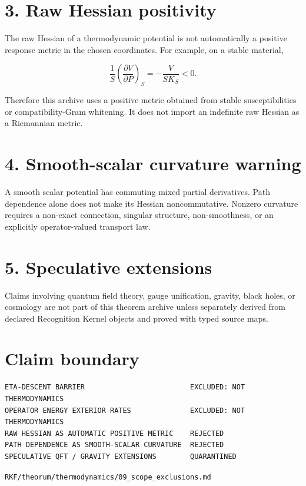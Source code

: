 \hypertarget{raw-hessian-positivity}{%
\section{3. Raw Hessian positivity}\label{raw-hessian-positivity}}

The raw Hessian of a thermodynamic potential is not automatically a positive response metric in the chosen coordinates. For example, on a stable material,

\[
\frac1S\left(\frac{\partial V}{\partial P}\right)_S
=-\frac{V}{SK_S}<0.
\]

Therefore this archive uses a positive metric obtained from stable susceptibilities or compatibility-Gram whitening. It does not import an indefinite raw Hessian as a Riemannian metric.

\hypertarget{smooth-scalar-curvature-warning}{%
\section{4. Smooth-scalar curvature warning}\label{smooth-scalar-curvature-warning}}

A smooth scalar potential has commuting mixed partial derivatives. Path dependence alone does not make its Hessian noncommutative. Nonzero curvature requires a non-exact connection, singular structure, non-smoothness, or an explicitly operator-valued transport law.

\hypertarget{speculative-extensions}{%
\section{5. Speculative extensions}\label{speculative-extensions}}

Claims involving quantum field theory, gauge unification, gravity, black holes, or cosmology are not part of this theorem archive unless separately derived from declared Recognition Kernel objects and proved with typed source maps.

\hypertarget{claim-boundary}{%
\section{Claim boundary}\label{claim-boundary}}

\begin{verbatim}
ETA-DESCENT BARRIER                         EXCLUDED: NOT THERMODYNAMICS
OPERATOR ENERGY EXTERIOR RATES              EXCLUDED: NOT THERMODYNAMICS
RAW HESSIAN AS AUTOMATIC POSITIVE METRIC    REJECTED
PATH DEPENDENCE AS SMOOTH-SCALAR CURVATURE  REJECTED
SPECULATIVE QFT / GRAVITY EXTENSIONS        QUARANTINED
\end{verbatim}

\begin{flushright}\small\texttt{RKF/theorum/thermodynamics/09\_scope\_exclusions.md}\end{flushright}
